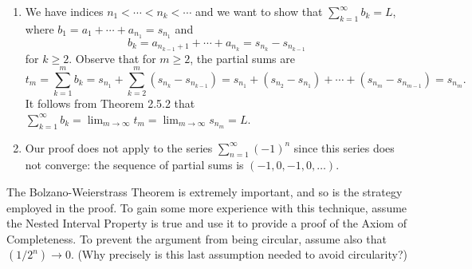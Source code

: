 \documentclass{lew98_solutions}
\begin{document}
\begin{solution}
    \begin{enumerate}
        \item We have indices \( n_1 < \cdots < n_k < \cdots \) and we want to show that \( \sum_{k=1}^{\infty} b_k = L \), where \( b_1 = a_1 + \cdots + a_{n_1} = s_{n_1} \) and
        \[
            b_k = a_{n_{k-1} + 1} + \cdots + a_{n_k} = s_{n_k} - s_{n_{k-1}}
        \]
        for \( k \geq 2 \). Observe that for \( m \geq 2 \), the partial sums are
        \[
            t_m = \sum_{k=1}^m b_k = s_{n_1} + \sum_{k=2}^m (s_{n_k} - s_{n_{k-1}}) = s_{n_1} + (s_{n_2} - s_{n_1}) + \cdots + (s_{n_m} - s_{n_{m-1}}) = s_{n_m}.
        \]
        It follows from Theorem 2.5.2 that \( \sum_{k=1}^{\infty} b_k = \lim_{m \to \infty} t_m = \lim_{m \to \infty} s_{n_m} = L \).

        \item Our proof does not apply to the series \( \sum_{n=1}^{\infty} (-1)^n \) since this series does not converge: the sequence of partial sums is \( (-1, 0, -1, 0, \ldots) \).
    \end{enumerate}
\end{solution}

\begin{exercise}
\label{ex:2.5.4}
    The Bolzano-Weierstrass Theorem is extremely important, and so is the strategy employed in the proof. To gain some more experience with this technique, assume the Nested Interval Property is true and use it to provide a proof of the Axiom of Completeness. To prevent the argument from being circular, assume also that \( (1/2^n) \to 0 \). (Why precisely is this last assumption needed to avoid circularity?)
\end{exercise}
\end{document}
